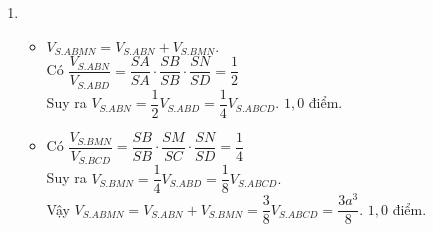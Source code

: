 \begin{bt}
{\begin{enumerate}
\begin{itemize}
	Vậy  $V_{BCMN}=\dfrac{1}{8}V_{S.ABCD}=\dfrac{a^3}{8}$ .\dotfill $1{,}0$ điểm.
	\end{itemize}
    \item 
	\begin{itemize}
	\item $V_{S.ABMN}=V_{S.ABN}+V_{S.BMN}$.\\
	Có $\dfrac{V_{S.ABN}}{V_{S.ABD}}=\dfrac{SA}{SA}\cdot \dfrac{SB}{SB}\cdot \dfrac{SN}{SD}=\dfrac{1}{2}$\\
	Suy ra $V_{S.ABN}=\dfrac{1}{2}V_{S.ABD}=\dfrac{1}{4}V_{S.ABCD}.$ \dotfill $1{,}0$ điểm.
	\item Có $\dfrac{V_{S.BMN}}{V_{S.BCD}}=\dfrac{SB}{SB}\cdot \dfrac{SM}{SC}\cdot \dfrac{SN}{SD}=\dfrac{1}{4}$\\
	Suy ra $V_{S.BMN}=\dfrac{1}{4}V_{S.ABD}=\dfrac{1}{8}V_{S.ABCD}.$\\
	Vậy $V_{S.ABMN}=V_{S.ABN}+V_{S.BMN}=\dfrac{3}{8}V_{S.ABCD}=\dfrac{3a^3}{8}$. \dotfill $1{,}0$ điểm.
	\end{itemize}
\end{enumerate}
	}
\end{bt}

